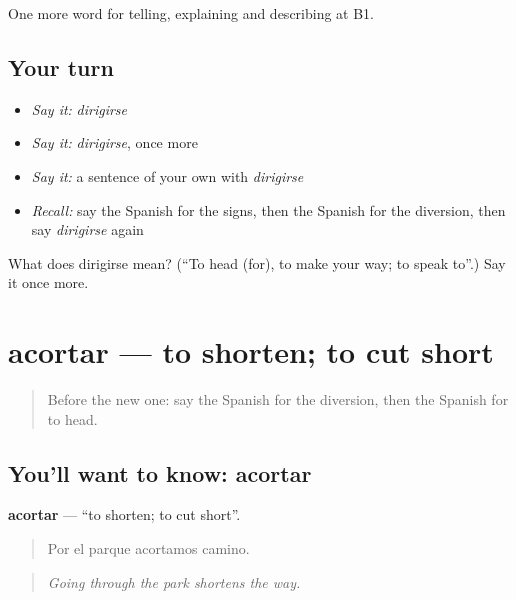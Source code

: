 \begin{grammarlens}[title={What you've built}]
One more word for telling, explaining and describing at B1.
\end{grammarlens}

\subsection*{Your turn}
\begin{itemize}
\raggedright
  \item \emph{Say it:} \emph{dirigirse}
  \item \emph{Say it:} \emph{dirigirse}, once more
  \item \emph{Say it:} a sentence of your own with \emph{dirigirse}
  \item \emph{Recall:} say the Spanish for the signs, then the Spanish for the diversion, then say \emph{dirigirse} again
\end{itemize}

\begin{tcolorbox}[breakable,colback=teal!4,colframe=teal!35!black,title={Before you move on}]
What does dirigirse mean? (\textquotedblleft{}To head (for), to make your way; to speak to\textquotedblright{}.) Say it once more.
\end{tcolorbox}
\section[acortar]{acortar — to shorten; to cut short}

\label{lesson:ES-C673-acortar}



\begin{quote}
Before the new one: say the Spanish for the diversion, then the Spanish for to head.
\end{quote}

\subsection*{You'll want to know: acortar}
\textbf{acortar} — \textquotedblleft{}to shorten; to cut short\textquotedblright{}.

\begin{quote}
Por el parque acortamos camino.
\end{quote}

\begin{quote}
\emph{Going through the park shortens the way.}
\end{quote}

